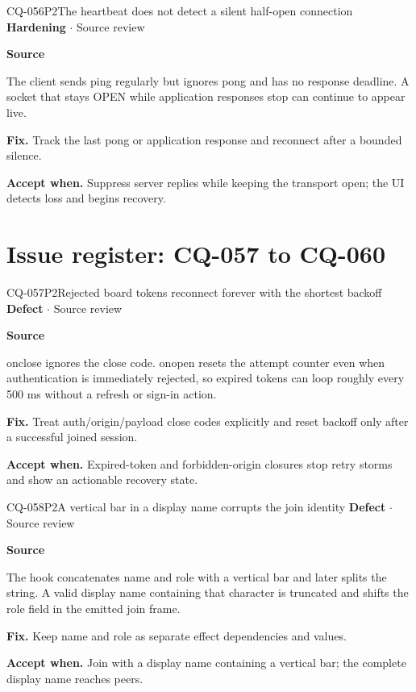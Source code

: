\begin{finding}{CQ-056}{P2}{The heartbeat does not detect a silent half-open connection}
\textbf{Hardening} $\cdot$ Source review\par
\textbf{Source}\quad{}\par
The client sends ping regularly but ignores pong and has no response deadline. A socket that stays OPEN while application responses stop can continue to appear live.\par
\textbf{Fix.} Track the last pong or application response and reconnect after a bounded silence.\par
\textbf{Accept when.} Suppress server replies while keeping the transport open; the UI detects loss and begins recovery.
\end{finding}
\clearpage
\section*{Issue register: CQ-057 to CQ-060}
\begin{finding}{CQ-057}{P2}{Rejected board tokens reconnect forever with the shortest backoff}
\textbf{Defect} $\cdot$ Source review\par
\textbf{Source}\quad{}\par
onclose ignores the close code. onopen resets the attempt counter even when authentication is immediately rejected, so expired tokens can loop roughly every 500 ms without a refresh or sign-in action.\par
\textbf{Fix.} Treat auth/origin/payload close codes explicitly and reset backoff only after a successful joined session.\par
\textbf{Accept when.} Expired-token and forbidden-origin closures stop retry storms and show an actionable recovery state.
\end{finding}
\begin{finding}{CQ-058}{P2}{A vertical bar in a display name corrupts the join identity}
\textbf{Defect} $\cdot$ Source review\par
\textbf{Source}\quad{}\par
The hook concatenates name and role with a vertical bar and later splits the string. A valid display name containing that character is truncated and shifts the role field in the emitted join frame.\par
\textbf{Fix.} Keep name and role as separate effect dependencies and values.\par
\textbf{Accept when.} Join with a display name containing a vertical bar; the complete display name reaches peers.
\end{finding}
